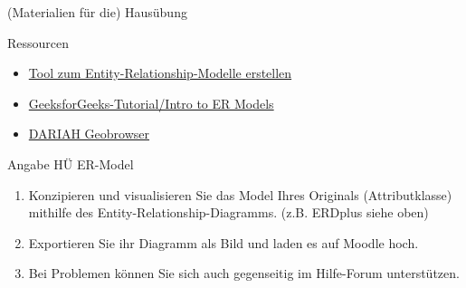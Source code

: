 \begin{frame}[allowframebreaks]{(Materialien für die) Hausübung}
\begin{exampleblock}{Ressourcen}
    \begin{itemize}\footnotesize
        \item \href{https://erdplus.com/standalone}{Tool zum Entity-Relationship-Modelle erstellen}
        \item \href{https://www.geeksforgeeks.org/introduction-of-er-model/}{GeeksforGeeks-Tutorial/Intro to ER Models}
        \item \href{https://geobrowser.de.dariah.eu/}{DARIAH Geobrowser}

    \end{itemize}
\end{exampleblock}

\begin{alertblock}{Angabe HÜ ER-Model}
    \begin{enumerate}\footnotesize
        \item Konzipieren und visualisieren Sie das Model Ihres Originals (Attributklasse) mithilfe des Entity-Relationship-Diagramms. (z.B. ERDplus siehe oben)
        \item Exportieren Sie ihr Diagramm als Bild und laden es auf Moodle hoch.
        \item Bei Problemen können Sie sich auch gegenseitig im Hilfe-Forum unterstützen.
    \end{enumerate}
\end{alertblock}
\end{frame}


